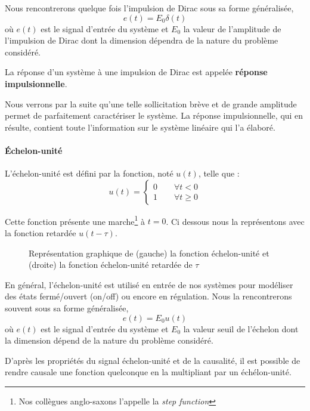 Nous rencontrerons quelque fois l'impulsion de Dirac sous sa forme généralisée, 
$$
e(t)=E_0\delta(t)
$$
où $e(t)$ est le signal d'entrée du système et $E_0$ la valeur de l'amplitude 
de l'impulsion de Dirac dont la dimension dépendra de la nature du 
problème considéré.

La réponse d'un système à une impulsion de Dirac est appelée 
\textbf{réponse impulsionnelle}.

Nous verrons par la suite qu'une telle sollicitation brève et de grande amplitude
permet de parfaitement caractériser le système. La réponse impulsionnelle, 
qui en résulte, contient toute l'information sur le système linéaire qui l'a élaboré.

\paragraph{\'Echelon-unité}
L'échelon-unité est défini par la fonction, noté $u(t)$, telle que :
$$
u(t)=
\begin{cases} 
0 \qquad \forall t<0    \\ 
1 \qquad \forall t\geq 0 
\end{cases}
$$

Cette fonction présente une marche\footnote{Nos 
collègues anglo-saxons l'appelle la \og\emph{step function}\fg} à $t=0$. 
Ci dessous nous la représentons avec la fonction retardée $u(t-\tau)$.
\begin{figure}[!h]
    \centering
    
    \caption{Représentation graphique de (gauche) la fonction échelon-unité 
             et (droite) la fonction échelon-unité retardée de $\tau$
            \label{fig-echelon}}
\end{figure}

En général, l'échelon-unité est utilisé en entrée de nos systèmes pour 
modéliser des états fermé/ouvert (\og on/off\fg) ou encore en régulation.
Nous la rencontrerons souvent sous sa forme généralisée, 
$$
e(t)=E_0u(t)
$$
où $e(t)$ est le signal d'entrée du système et $E_0$ la valeur seuil 
de l'échelon dont la dimension dépend de la nature du problème considéré.

D'après les propriétés du signal échelon-unité et de la causalité, il 
est possible de rendre causale une fonction quelconque en la 
multipliant par un échélon-unité.


